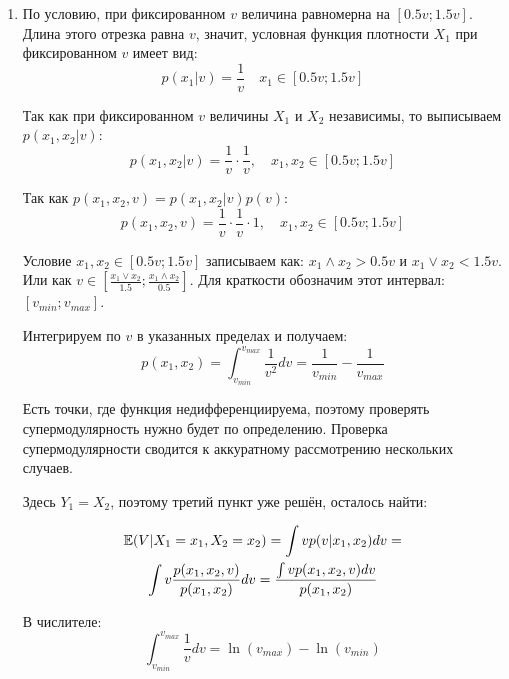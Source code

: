 \begin{enumerate}


\item  По условию, при фиксированном $ v $ величина равномерна на $ [0.5v;1.5v] $. Длина этого отрезка равна $ v $, значит, условная функция плотности $ X_{1} $ при фиксированном $ v $ имеет вид:
\begin{equation}
p(x_{1}|v)=\frac{1}{v}\quad x_{1}\in [0.5v;1.5v]
\end{equation}


Так как при фиксированном $ v $ величины $X_{1}  $ и $ X_{2} $ независимы, то выписываем $ p(x_{1},x_{2}|v) $:
\begin{equation}
p(x_{1},x_{2}|v)=\frac{1}{v}\cdot \frac{1}{v}, \quad x_{1},x_{2}\in [0.5v;1.5v]
\end{equation}

Так как $ p(x_{1},x_{2},v)=p(x_{1},x_{2}|v)p(v) $:
\begin{equation}
p(x_{1},x_{2},v)=\frac{1}{v}\cdot \frac{1}{v}\cdot 1, \quad x_{1},x_{2}\in [0.5v;1.5v]
\end{equation}

Условие $ x_{1},x_{2}\in [0.5v;1.5v] $ записываем как: $ x_{1}\wedge x_{2} > 0.5v $ и $ x_{1}\vee x_{2} <1.5v $. Или как $ v\in [\frac{x_{1}\vee x_{2}}{1.5};\frac{x_{1}\wedge x_{2}}{0.5}] $. Для краткости обозначим этот интервал: $ [v_{min};v_{max}] $.

Интегрируем по $ v $ в указанных пределах и получаем:
\begin{equation}
p(x_{1},x_{2})=\int_{v_{min}}^{v_{max}}\frac{1}{v^{2}}dv=\frac{1}{v_{min}}-\frac{1}{v_{max}}
\end{equation}

Есть точки, где функция недифференциируема, поэтому проверять супермодулярность нужно будет по определению. Проверка супермодулярности сводится к аккуратному рассмотрению нескольких случаев.

Здесь $ Y_{1}=X_{2} $, поэтому третий пункт уже решён, осталось найти:

\begin{multline}
\operatorname{\mathbb{E}}(V|X_{1}=x_{1}, X_{2}=x_{2})=\int v p(v|x_{1},x_{2})dv=\\
\int v \frac{p(x_{1},x_{2},v)}{p(x_{1},x_{2})} dv=\frac{\int v p(x_{1},x_{2},v) dv }{p(x_{1},x_{2})}
\end{multline}

В числителе:
\begin{equation}
\int_{v_{min}}^{v_{max}}\frac{1}{v}dv=\ln(v_{max})-\ln(v_{min})
\end{equation}


\end{enumerate}
